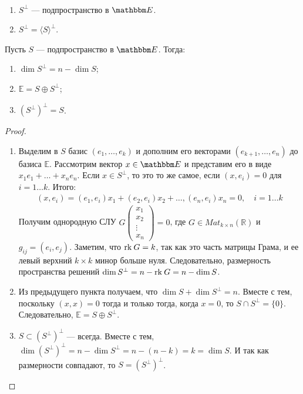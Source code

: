 \begin{Comment}\
	\begin{enumerate}
		\item $S^\perp$ --- подпространство в $\E$.
		\item $S^\perp = \langle S \rangle^\perp$.
	\end{enumerate}
\end{Comment}

\begin{Suggestion}
Пусть $S$ --- подпространство в $\E$. Тогда:
	\begin{enumerate}
		\item $\dim S^\perp = n - \dim S$;
		\item $\mathbb{E} = S \oplus S^\perp$;
		\item $(S^\perp)^\perp = S$.
	\end{enumerate}
\end{Suggestion}

\begin{proof}\
	\begin{enumerate}
	\item Выделим в $S$ базис $(e_1, \ldots, e_k)$ и дополним его векторами $(e_{k+1}, \ldots, e_n)$ до базиса $\mathbb{E}$. Рассмотрим вектор $x \in \E$ и представим его в виде $x_1e_1 + \ldots + x_ne_n$. Если $x \in S^\perp$, то это то же самое, если $(x, e_i) = 0$ для $i = 1 \ldots k$. Итого:
	\begin{gather*}
		(x,e_i) = (e_1, e_i)x_1 + (e_2, e_i) x_2 + \ldots, (e_n, e_i) x_n= 0, \quad i = 1 \ldots k		
	\end{gather*}
	Получим однородную СЛУ $G\begin{pmatrix}
	x_1\\x_2\\ \vdots\\ x_n
	\end{pmatrix} = 0$, где $G \in Mat_{k\times n}(\mathbb{R})$ и $g_{ij} = (e_i, e_j)$. Заметим, что $\mathrm{rk}\: G =  k$, так как это часть матрицы Грама, и ее левый верхний $k\times k$ минор больше нуля. Следовательно, размерность пространства решений $\dim S^\perp = n - \mathrm{rk}\: G = n - \dim S$.
	\item Из предыдущего пункта получаем, что $\dim S + \dim S^\perp = n$. Вместе с тем, поскольку $(x,x) = 0$ тогда и только тогда, когда $x = 0$, то $S \cap S^\perp = \{0\}$. Следовательно, $\mathbb{E} = S \oplus S^\perp$.
	\item $S \subset (S^\perp)^\perp$ --- всегда. Вместе с тем, $\dim (S^\perp)^\perp = n - \dim S^\perp = n - (n - k) =  k = \dim S$. И так как размерности совпадают, то $S = (S^\perp)^\perp$.
\end{enumerate}
\end{proof}

